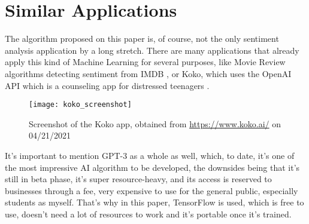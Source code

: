 \section{Similar Applications}
The algorithm proposed on this paper is, of course, not the only sentiment analysis application by a long stretch. There are many applications that already apply this kind of Machine Learning for several purposes, like Movie Review algorithms detecting sentiment from IMDB \citep{rf5}, or Koko, which uses the OpenAI API which is a counseling app for distressed teenagers \citep{rf6}.
\begin{figure}[h]
	\centering
	\texttt{[image: koko\_screenshot]}
	\caption{Screenshot of the Koko app, obtained from \url{https://www.koko.ai/} on 04/21/2021}
	\label{fig:koko}
\end{figure}
It's important to mention GPT-3 as a whole as well, which, to date, it's one of the most impressive AI algorithm to be developed, the downsides being that it's still in beta phase, it's super resource-heavy, and its access is reserved to businesses through a fee, very expensive to use for the general public, especially students as myself. That's why in this paper, TensorFlow is used, which is free to use, doesn't need a lot of resources to work and it's portable once it's trained.

\clearpage